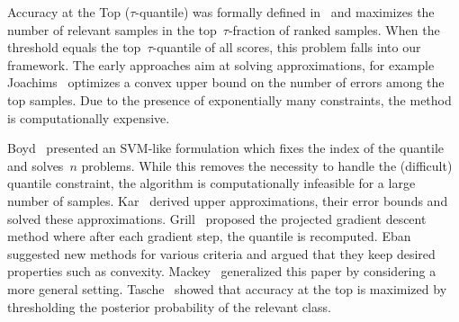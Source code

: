 \documentclass[11pt,a4paper]{article}
\theoremstyle{definition}
\begin{document}
Accuracy at the Top ($\tau$-quantile) was formally defined in~\cite{boyd2012accuracy} and maximizes the number of relevant samples in the top~$\tau$-fraction of ranked samples. When the threshold equals the top~$\tau$-quantile of all scores, this problem falls into our framework. The early approaches aim at solving approximations, for example Joachims~\cite{joachims2005support} optimizes a convex upper bound on the number of errors among the top samples. Due to the presence of exponentially many constraints, the method is computationally expensive.

Boyd~\cite{boyd2012accuracy} presented an SVM-like formulation which fixes the index of the quantile and solves~$n$ problems. While this removes the necessity to handle the (difficult) quantile constraint, the algorithm is computationally infeasible for a large number of samples. Kar~\cite{kar2015surrogate} derived upper approximations, their error bounds and solved these approximations. Grill~\cite{grill2016learning} proposed the projected gradient descent method where after each gradient step, the quantile is recomputed. Eban~\cite{eban2017scalable} suggested new methods for various criteria and argued that they keep desired properties such as convexity. Mackey~\cite{mackey2018constrained} generalized this paper by considering a more general setting. Tasche~\cite{tasche2018plug} showed that accuracy at the top is maximized by thresholding the posterior probability of the relevant class.
\end{document}
